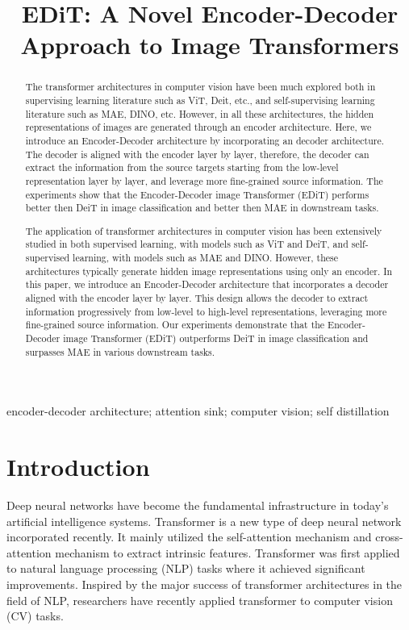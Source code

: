 \documentclass[anon,12pt]{colt2024} %
\title[Short Title]{
  EDiT: A Novel Encoder-Decoder Approach to Image Transformers
  }
\begin{document}
\maketitle

\begin{abstract}%
  The transformer architectures in computer vision have been much explored both in supervising learning literature such as ViT, Deit, etc., and self-supervising learning literature such as MAE, DINO, etc.
  However, in all these architectures, the hidden representations of images are generated through an encoder architecture.
  Here, we introduce an Encoder-Decoder architecture by incorporating an decoder architecture.
  The decoder is aligned with the encoder layer by layer, therefore, the decoder can extract the information from the source targets starting from the low-level representation layer by layer, and leverage more fine-grained source information.
  The experiments show that the Encoder-Decoder image Transformer (EDiT) performs better then DeiT in image classification and better then MAE in downstream tasks.
  
  The application of transformer architectures in computer vision has been extensively studied in both supervised learning, with models such as ViT and DeiT, and self-supervised learning, with models such as MAE and DINO. However, these architectures typically generate hidden image representations using only an encoder. In this paper, we introduce an Encoder-Decoder architecture that incorporates a decoder aligned with the encoder layer by layer. This design allows the decoder to extract information progressively from low-level to high-level representations, leveraging more fine-grained source information. Our experiments demonstrate that the Encoder-Decoder image Transformer (EDiT) outperforms DeiT in image classification and surpasses MAE in various downstream tasks.
  
\end{abstract}

\begin{keywords}%
  encoder-decoder architecture; attention sink; computer vision; self distillation%
\end{keywords}

\section{Introduction}

Deep neural networks have become the fundamental infrastructure in today's artificial intelligence systems. 
Transformer \cite{vaswani2017attention} is a new type of deep neural network incorporated recently.
It mainly utilized the self-attention mechanism and cross-attention mechanism to extract intrinsic features.
Transformer was first applied to natural language processing (NLP) tasks \cite{vaswani2017attention, devlin2018bert,radford2018improving, brown2020language,ouyang2022training} where it achieved significant improvements.
Inspired by the major success of transformer architectures in the field of NLP, researchers have recently applied transformer to computer vision (CV) tasks.
\end{document}
